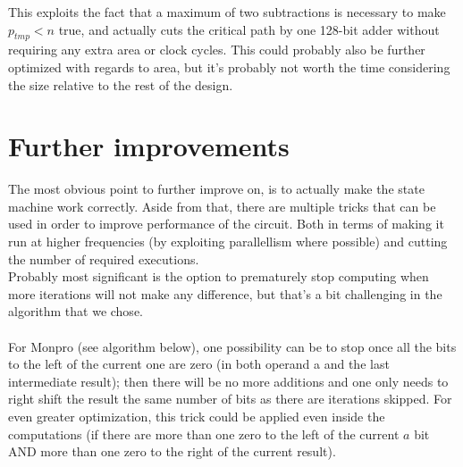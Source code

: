 \inputminted[firstline=74,lastline=78]{VHDL}{../Project/VHDL/RSA_module.srcs/sources_1/new/blakley.vhd}

This exploits the fact that a maximum of two subtractions is necessary to make $p_{tmp} < n$ true, and actually cuts the critical path by one 128-bit adder without requiring any extra area or clock cycles. This could probably also be further optimized with regards to area, but it's probably not worth the time considering the size relative to the rest of the design.\\

\section{Further improvements}
The most obvious point to further improve on, is to actually make the state machine work correctly. Aside from that, there are multiple tricks that can be used in order to improve performance of the circuit. Both in terms of making it run at higher frequencies (by exploiting parallellism where possible) and cutting the number of required executions.\\
Probably most significant is the option to prematurely stop computing when more iterations will not make any difference, but that's a bit challenging in the algorithm that we chose.\\\\
For Monpro (see algorithm below), one possibility can be to stop once all the bits to the left of the current one are zero (in both operand a and the last intermediate result); then there will be no more additions and one only needs to right shift the result the same number of bits as there are iterations skipped. For even greater optimization, this trick could be applied even inside the computations (if there are more than one zero to the left of the current $a$ bit AND more than one zero to the right of the current result).

\inputminted[firstline=13,lastline=26]{python}{../Project/monexp.py}
